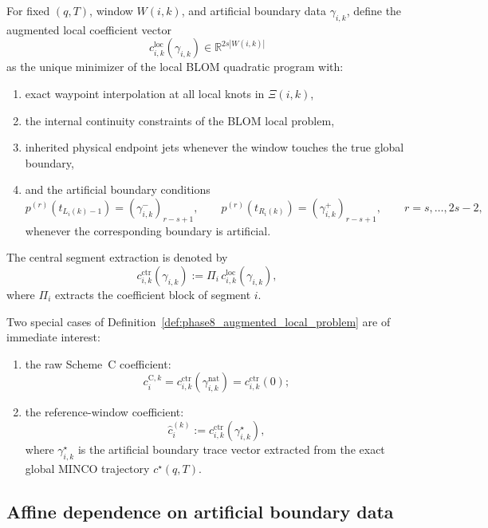 \begin{definition}
\label{def:phase8_augmented_local_problem}
For fixed \((q,T)\), window \(W(i,k)\), and artificial boundary data \(\gamma_{i,k}\), define the augmented local coefficient vector
\[
c^{\mathrm{loc}}_{i,k}(\gamma_{i,k})\in\mathbb R^{2s|W(i,k)|}
\]
as the unique minimizer of the local BLOM quadratic program with:
\begin{enumerate}
    \item exact waypoint interpolation at all local knots in \(\Xi(i,k)\),
    \item the internal continuity constraints of the BLOM local problem,
    \item inherited physical endpoint jets whenever the window touches the true global boundary,
    \item and the artificial boundary conditions
    \[
    p^{(r)}(t_{L_i(k)-1})=(\gamma^-_{i,k})_{r-s+1},
    \qquad
    p^{(r)}(t_{R_i(k)})=(\gamma^+_{i,k})_{r-s+1},
    \qquad
    r=s,\dots,2s-2,
    \]
    whenever the corresponding boundary is artificial.
\end{enumerate}
The central segment extraction is denoted by
\begin{equation}
\label{eq:phase8_central_extraction_gamma}
c_{i,k}^{\mathrm{ctr}}(\gamma_{i,k})
:=
\Pi_i\,c^{\mathrm{loc}}_{i,k}(\gamma_{i,k}),
\end{equation}
where \(\Pi_i\) extracts the coefficient block of segment \(i\).
\end{definition}

\begin{remark}
\label{rem:phase8_raw_and_reference_window}
Two special cases of Definition~\ref{def:phase8_augmented_local_problem} are of immediate interest:
\begin{enumerate}
    \item the raw Scheme~C coefficient:
    \[
    c_i^{\mathrm{C},k}=c_{i,k}^{\mathrm{ctr}}(\gamma_{i,k}^{\mathrm{nat}})=c_{i,k}^{\mathrm{ctr}}(0);
    \]
    \item the reference-window coefficient:
    \[
    \hat c_i^{(k)}:=c_{i,k}^{\mathrm{ctr}}(\gamma_{i,k}^{\star}),
    \]
    where \(\gamma_{i,k}^{\star}\) is the artificial boundary trace vector extracted from the exact global MINCO trajectory \(c^\star(q,T)\).
\end{enumerate}
\end{remark}

\subsection{Affine dependence on artificial boundary data}
\label{subsec:phase8_affine_boundary_response}

